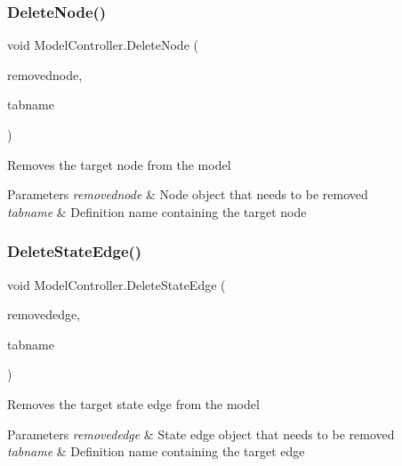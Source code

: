 \subsubsection{\texorpdfstring{Delete\+Node()}{DeleteNode()}}
{\footnotesize\ttfamily void Model\+Controller.\+Delete\+Node (\begin{DoxyParamCaption}\item[{M\+M.\+Model.\+Node}]{removednode,  }\item[{string}]{tabname }\end{DoxyParamCaption})}



Removes the target node from the model 


\begin{DoxyParams}{Parameters}
{\em removednode} & Node object that needs to be removed\\
\hline
{\em tabname} & Definition name containing the target node\\
\hline
\end{DoxyParams}
\mbox{\label{class_model_controller_aa941845548865a4f06a78537f78ec236}} 
\subsubsection{\texorpdfstring{Delete\+State\+Edge()}{DeleteStateEdge()}}
{\footnotesize\ttfamily void Model\+Controller.\+Delete\+State\+Edge (\begin{DoxyParamCaption}\item[{M\+M.\+Model.\+State\+Edge}]{removededge,  }\item[{string}]{tabname }\end{DoxyParamCaption})}



Removes the target state edge from the model 


\begin{DoxyParams}{Parameters}
{\em removededge} & State edge object that needs to be removed\\
\hline
{\em tabname} & Definition name containing the target edge\\
\hline
\end{DoxyParams}
\mbox{\label{class_model_controller_a961f8ecc991434e6751ddc1f63864509}} 
